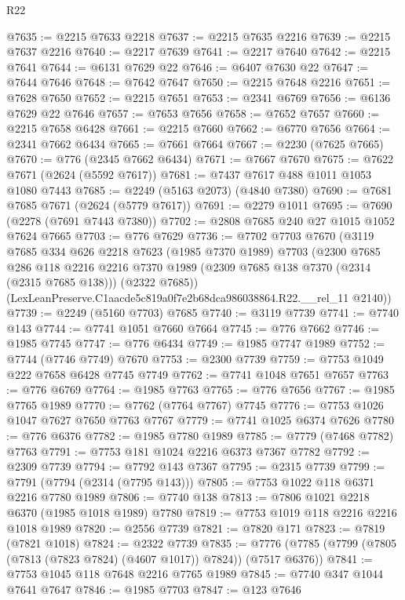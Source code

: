 \begin{lexlean}{R22}
\begin{coremodule}
@7635 := @2215 @7633 @2218
@7637 := @2215 @7635 @2216
@7639 := @2215 @7637 @2216
@7640 := @2217 @7639
@7641 := @2217 @7640
@7642 := @2215 @7641
@7644 := @6131 @7629 @22
@7646 := @6407 @7630 @22
@7647 := @7644 @7646
@7648 := @7642 @7647
@7650 := @2215 @7648 @2216
@7651 := @7628 @7650
@7652 := @2215 @7651
@7653 := @2341 @6769
@7656 := @6136 @7629 @22 @7646
@7657 := @7653 @7656
@7658 := @7652 @7657
@7660 := @2215 @7658 @6428
@7661 := @2215 @7660
@7662 := @6770 @7656
@7664 := @2341 @7662 @6434
@7665 := @7661 @7664
@7667 := @2230 (@7625 @7665)
@7670 := @776 (@2345 @7662 @6434)
@7671 := @7667 @7670
@7675 := @7622 @7671 (@2624 (@5592 @7617))
@7681 := @7437 @7617 @488 @1011 @1053 @1080 @7443
@7685 := @2249 (@5163 @2073) (@4840 @7380)
@7690 := @7681 @7685 @7671 (@2624 (@5779 @7617))
@7691 := @2279 @1011
@7695 := @7690 (@2278 (@7691 @7443 @7380))
@7702 := @2808 @7685 @240 @27 @1015 @1052 @7624 @7665
@7703 := @776 @7629
@7736 := @7702
    @7703
    @7670
    (@3119
      @7685
      @334
      @626
      @2218
      @7623
      (@1985 @7370 @1989)
      @7703
      (@2300
        @7685
        @286
        @118
        @2216
        @2216
        @7370
        @1989
        (@2309 @7685 @138 @7370 (@2314 (@2315 @7685 @138)))
        (@2322 @7685))
      (LexLeanPreserve.C1aacde5c819a0f7e2b68dca986038864.R22.__rel_11 @2140))
@7739 := @2249 (@5160 @7703) @7685
@7740 := @3119 @7739
@7741 := @7740 @143
@7744 := @7741 @1051 @7660 @7664
@7745 := @776 @7662
@7746 := @1985 @7745
@7747 := @776 @6434
@7749 := @1985 @7747 @1989
@7752 := @7744 (@7746 @7749) @7670
@7753 := @2300 @7739
@7759 := @7753 @1049 @222 @7658 @6428 @7745 @7749
@7762 := @7741 @1048 @7651 @7657
@7763 := @776 @6769
@7764 := @1985 @7763
@7765 := @776 @7656
@7767 := @1985 @7765 @1989
@7770 := @7762 (@7764 @7767) @7745
@7776 := @7753 @1026 @1047 @7627 @7650 @7763 @7767
@7779 := @7741 @1025 @6374 @7626
@7780 := @776 @6376
@7782 := @1985 @7780 @1989
@7785 := @7779 (@7468 @7782) @7763
@7791 := @7753 @181 @1024 @2216 @6373 @7367 @7782
@7792 := @2309 @7739
@7794 := @7792 @143 @7367
@7795 := @2315 @7739
@7799 := @7791 (@7794 (@2314 (@7795 @143)))
@7805 := @7753 @1022 @118 @6371 @2216 @7780 @1989
@7806 := @7740 @138
@7813 := @7806 @1021 @2218 @6370 (@1985 @1018 @1989) @7780
@7819 := @7753 @1019 @118 @2216 @2216 @1018 @1989
@7820 := @2556 @7739
@7821 := @7820 @171
@7823 := @7819 (@7821 @1018)
@7824 := @2322 @7739
@7835 := @7776 (@7785 (@7799 (@7805 (@7813 (@7823 @7824) (@4607 @1017)) @7824)) (@7517 @6376))
@7841 := @7753 @1045 @118 @7648 @2216 @7765 @1989
@7845 := @7740 @347 @1044 @7641 @7647
@7846 := @1985 @7703
@7847 := @123 @7646

\end{coremodule}
\end{lexlean}

